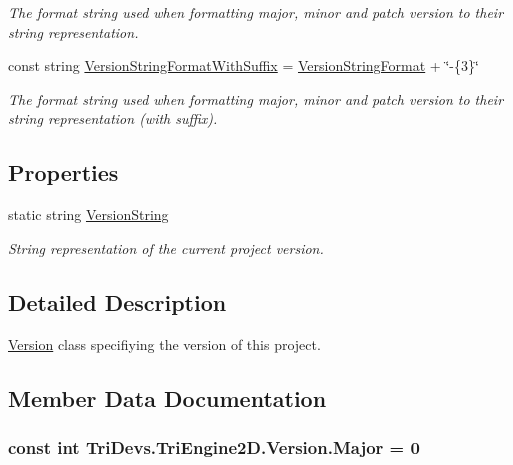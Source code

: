 \begin{DoxyCompactItemize}
\begin{DoxyCompactList}\small\item\em The format string used when formatting major, minor and patch version to their string representation. \end{DoxyCompactList}\item 
const string \hyperlink{class_tri_devs_1_1_tri_engine2_d_1_1_version_a6cb3be646f1ff0c726266576f5579e92}{Version\-String\-Format\-With\-Suffix} = \hyperlink{class_tri_devs_1_1_tri_engine2_d_1_1_version_a7ff4d8681e4833ef71067425aac665e4}{Version\-String\-Format} + \char`\"{}-\/\{3\}\char`\"{}
\begin{DoxyCompactList}\small\item\em The format string used when formatting major, minor and patch version to their string representation (with suffix). \end{DoxyCompactList}\end{DoxyCompactItemize}
\subsection*{Properties}
\begin{DoxyCompactItemize}
\item 
static string \hyperlink{class_tri_devs_1_1_tri_engine2_d_1_1_version_a489911cfed8c6053787bee8411650073}{Version\-String}
\begin{DoxyCompactList}\small\item\em String representation of the current project version. \end{DoxyCompactList}\end{DoxyCompactItemize}


\subsection{Detailed Description}
\hyperlink{class_tri_devs_1_1_tri_engine2_d_1_1_version}{Version} class specifiying the version of this project. 



\subsection{Member Data Documentation}
\hypertarget{class_tri_devs_1_1_tri_engine2_d_1_1_version_adf7439103e5307870f8a9b953e9f3933}{
\subsubsection[{Major}]{\setlength{\rightskip}{0pt plus 5cm}const int Tri\-Devs.\-Tri\-Engine2\-D.\-Version.\-Major = 0}}\label{class_tri_devs_1_1_tri_engine2_d_1_1_version_adf7439103e5307870f8a9b953e9f3933}



